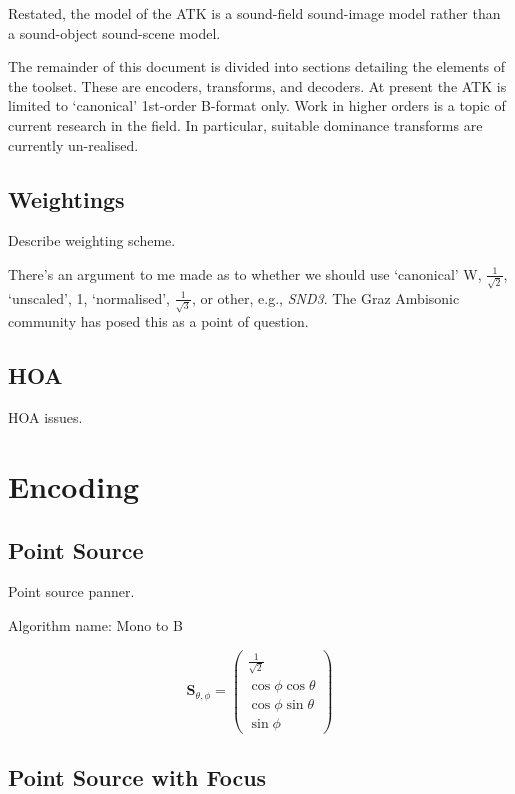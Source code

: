 \documentclass[12pt]{article}
\begin{document}
Restated, the model of the ATK is a sound-field sound-image model rather than a sound-object sound-scene model.

The remainder of this document is divided into sections detailing the elements of the toolset. These are encoders, transforms, and decoders. At present the ATK is limited to `canonical' 1st-order B-format only. Work in higher orders is a topic of current research in the field. In particular, suitable dominance transforms are currently un-realised.


\subsection{Weightings}

Describe weighting scheme.

There's an argument to me made as to whether we should use `canonical' W, \(\frac{1}{\sqrt{2}}\), `unscaled', 1, `normalised', \(\frac{1}{\sqrt{3}}\), or other, e.g., {\em SND3}. The Graz Ambisonic community has posed this as a point of question.

\subsection{HOA}

HOA issues.

\section{Encoding}

\subsection{Point Source}

Point source panner.

Algorithm name: Mono to B

\begin{equation}	\label{eq:point_encode}
\mathbf{S}_{\theta, \phi} = \begin{pmatrix}
	\frac{1}{\sqrt{2}}\\
	\cos{\phi} \cos{\theta}\\
	\cos{\phi} \sin{\theta}\\
	\sin{\phi}
\end{pmatrix}
\end{equation}


\subsection{Point Source with Focus}
\end{document}
